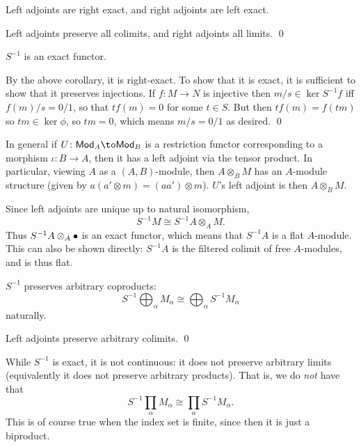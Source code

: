 \eproof

\bcoro

    Left adjoints are right exact, and right adjoints are left exact.

\ecoro

\bproof

    Left adjoints preserve all colimits, and right adjoints all limits.
    \qed

\eproof

\bcoro

    $S^{-1}$ is an exact functor.

\ecoro

\bproof

    By the above corollary, it is right-exact.
    To show that it is exact, it is sufficient to show that it preserves injections.
    If $f\colon M\to N$ is injective then $m/s\in\ker S^{-1}f$ iff $f(m)/s=0/1$, so that $tf(m)=0$ for some $t\in S$.
    But then $tf(m)=f(tm)$ so $tm\in\ker\phi$, so $tm=0$, which means $m/s=0/1$ as desired.
    \qed

\eproof

In general if $U\colon\Mod_A\to\Mod_B$ is a restriction functor corresponding to a morphism $\iota\colon B\to A$, then it has a left adjoint
via the tensor product.
In particular, viewing $A$ as a $(A,B)$-module, then $A\otimes_BM$ has an $A$-module structure (given by $a(a'\otimes m)=(aa')\otimes m$).
$U$'s left adjoint is then $A\otimes_BM$.

Since left adjoints are unique up to natural isomorphism,
$$ S^{-1}M \cong S^{-1}A\otimes_AM . $$
Thus $S^{-1}A\otimes_A\bullet$ is an exact functor, which means that $S^{-1}A$ is a {\emphcolor flat} $A$-module.
This can also be shown directly: $S^{-1}A$ is the filtered colimit of free $A$-modules, and is thus flat.

\bcoro

    $S^{-1}$ preserves arbitrary coproducts:
    $$ S^{-1}\bigoplus_\alpha M_\alpha \cong \bigoplus_\alpha S^{-1}M_\alpha $$
    naturally.

\ecoro

\bproof

    Left adjoints preserve arbitrary colimits.
    \qed

\eproof

\bnote

    While $S^{-1}$ is exact, it is not {\emphcolor continuous}: it does not preserve arbitrary limits (equivalently it does not preserve
    arbitrary products).
    That is, we do {\it not\/} have that
    $$ S^{-1}\prod_\alpha M_\alpha \cong \prod_\alpha S^{-1}M_\alpha . $$
    This is of course true when the index set is finite, since then it is just a biproduct.

